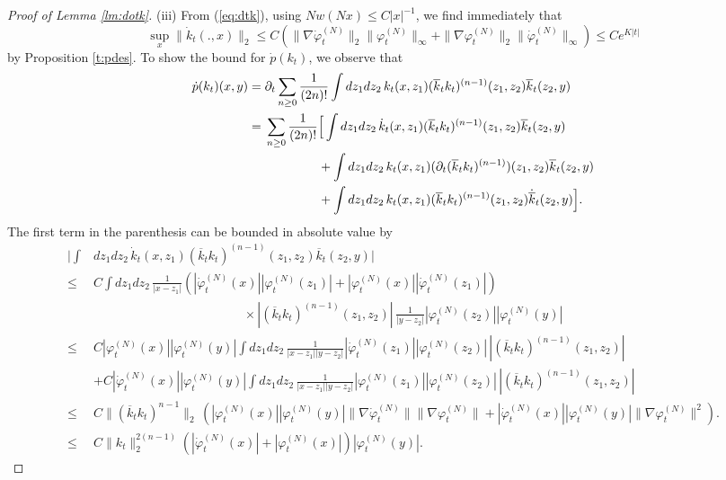 \documentclass[11pt,a4paper]{article}
\newcommand{\ph}{\varphi_t^{(N)}}	%
\newcommand{\phdot}{\dot{\varphi}_t^{(N)}}	%
\begin{document}
\begin{proof}[Proof of Lemma \ref{lm:dotk}]
(iii)  {F}rom (\ref{eq:dtk}), using $N w(Nx) \leq C|x|^{-1}$, we find immediately that
\[ \sup_x \| \dot{k}_t (.,x) \|_2 \leq C \left(\| \nabla \phdot \|_2 \| \ph \|_\infty + \| \nabla \ph \|_2 \|\phdot\|_\infty \right) \leq C e^{K|t|} \]
by Proposition \ref{t:pdes}. To show the bound for $\dot{p} (k_t)$, we observe that
\begin{equation}\label{eq:px2} \begin{split}
\dot{p} (k_t) (x,y) = \; & \partial_t \sum_{n \geq 0}\frac{1}{(2n)!} \int dz_1 dz_2 \, k_t (x,z_1) (\overline{k}_t k_t)^{(n-1)} (z_1 ,z_2) \overline{k}_t (z_2 ,y ) \\ = \;& \sum_{n \geq 0}\frac{1}{(2n)!} \Big[  \int dz_1 dz_2 \, \dot{k}_t (x,z_1) (\overline{k}_t k_t)^{(n-1)} (z_1 ,z_2) \overline{k}_t (z_2 ,y ) \\ &\hspace{1.5cm} +
 \int dz_1 dz_2 \, k_t (x,z_1) (\partial_t (\overline{k}_t k_t)^{(n-1)}) (z_1 ,z_2) \overline{k}_t (z_2 ,y )\\
  &\hspace{1.5cm} + \int dz_1 dz_2 \, k_t (x,z_1) (\overline{k}_t k_t)^{(n-1)} (z_1 ,z_2) \dot{\overline{k}}_t (z_2 ,y ) \Big]. \end{split} \end{equation}
The first term in the parenthesis can be bounded in absolute value by
\[ \begin{split} 
\Big| \int &dz_1 dz_2 \, \dot{k}_t (x,z_1) (\overline{k}_t k_t)^{(n-1)} (z_1 ,z_2) \overline{k}_t (z_2 ,y ) \Big| \\ \leq \; &C \int dz_1 dz_2 \, \frac{1}{|x-z_1|} \left( |\phdot (x)| |\ph (z_1)|+ |\ph (x)| |\phdot (z_1)| \right)  \\ &\hspace{5cm} \times | (\overline{k}_t k_t)^{(n-1)} (z_1 ,z_2)| \, \frac{1}{|y-z_2|} |\ph (z_2)| |\ph (y)| \\
\leq \; &C |\ph (x)| |\ph (y)| \int dz_1 dz_2 \, \frac{1}{|x-z_1||y-z_2|} |\phdot (z_1)|  |\ph (z_2)| \,  | (\overline{k}_t k_t)^{(n-1)} (z_1 ,z_2)| \\
&+ C |\phdot (x)| |\ph (y)| \int dz_1 dz_2 \, \frac{1}{|x-z_1||y-z_2|} |\ph (z_1)|  |\ph (z_2)| \,  | (\overline{k}_t k_t)^{(n-1)} (z_1 ,z_2)| 
\\ \leq \; & C \| (\overline{k}_t k_t)^{n-1} \|_2  \, \left( |\ph (x)| |\ph (y)| \| \nabla \phdot \| \| \nabla \ph \| +   |\phdot (x)| |\ph (y)| \| \nabla \ph \|^2 \right).
\\ \leq \; & C \| k_t \|_2^{2(n-1)} (|\phdot (x)| + |\ph (x)|) |\ph (y)|. 

\end{split}\]
\end{proof}
\end{document}
